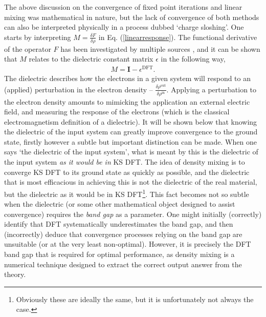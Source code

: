 The above discussion on the convergence of fixed point iterations and linear mixing was mathematical in nature, but the lack of convergence of both methods can also be interpreted physically in a process dubbed `charge sloshing'. One starts by interpreting $M = \frac{\delta F}{\delta \rho}$ in Eq$.$ (\ref{linearresponse}). The functional derivative of the operator $F$ has been investigated by multiple sources \citep{linear,Fderiv}, and it can be shown that $M$ relates to the dielectric constant matrix $\epsilon$ in the following way,
\begin{gather}
M = \textbf{I} - \epsilon^{\text{DFT}}.
\end{gather}
The dielectric describes how the electrons in a given system will respond to an (applied) perturbation in the electron density -- $\frac{\delta \rho^{\text{out}}}{\delta \rho^{\text{in}}}$. Applying a perturbation to the electron density amounts to mimicking the application an external electric field, and measuring the response of the electrons (which is the classical electromagnetism definition of a dielectric). It will be shown below that knowing the dielectric of the input system can greatly improve convergence to the ground state, firstly however a subtle but important distinction can be made. When one says `the dielectric of the input system', what is meant by this is the dielectric of the input system \textit{as it would be in} KS DFT. The idea of density mixing is to converge KS DFT to its ground state as quickly as possible, and the dielectric that is most efficacious in achieving this is not the dielectric of the real material, but the dielectric as it would be in KS DFT\footnote{Obviously these are ideally the same, but it is unfortunately not always the case.}. This fact becomes not so subtle when the dielectric (or some other mathematical object designed to assist convergence) requires the \textit{band gap} as a parameter. One might initially (correctly) identify that DFT systematically underestimates the band gap, and then (incorrectly) deduce that convergence processes relying on the band gap are unsuitable (or at the very least non-optimal). However, it is precisely the DFT band gap that is required for optimal performance, as density mixing is a numerical technique designed to extract the correct output answer from the theory.


